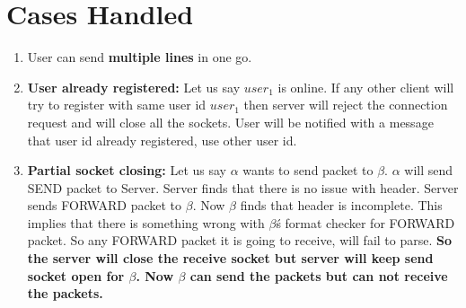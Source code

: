 \documentclass{article}
\begin{document}
\section{Cases Handled}
\begin{enumerate}
    \item User can send \textbf{multiple lines} in one go.
    \item \textbf{User already registered:} Let us say $user_{1}$ is online. If any other client will try to register with same user id $user_{1}$ then server will reject the connection request and will close all the sockets. User will be notified with a message that user id already registered, use other user id.
    \item \textbf{Partial socket closing:} Let us say $\alpha$ wants to send packet to $\beta$. $\alpha$ will send SEND packet to Server. Server finds that there is no issue with header. Server sends FORWARD packet to $\beta$. Now $\beta$ finds that header is incomplete. This implies that there is something wrong with $\beta$\'s format checker for FORWARD packet. So any FORWARD packet it is going to receive, will fail to parse. \textbf{So the server will close the receive socket but server will keep send socket open for $\beta$. Now $\beta$ can send the packets but can not receive the packets.}
\end{enumerate}{}
\end{document}
